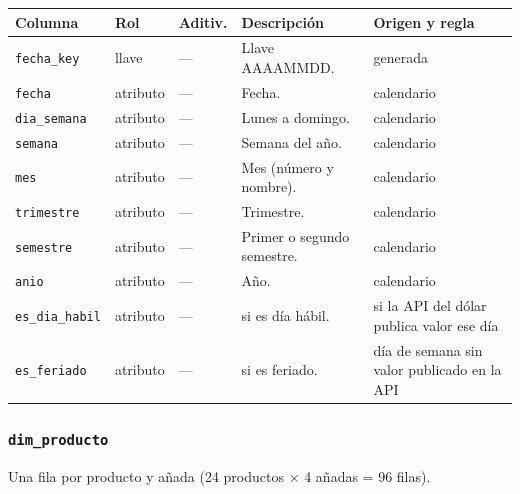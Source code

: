 {\footnotesize
\begin{longtable}{@{}>{\raggedright\arraybackslash}p{}>{\raggedright\arraybackslash}p{}>{\raggedright\arraybackslash}p{}>{\raggedright\arraybackslash}p{}>{\raggedright\arraybackslash}p{}@{}}
\toprule
Columna & Rol & Aditiv. & Descripción & Origen y regla \\
\midrule
\endhead
\texttt{fecha\_key} & llave & — & Llave AAAAMMDD. & generada \\
\texttt{fecha} & atributo & — & Fecha. & calendario \\
\texttt{dia\_semana} & atributo & — & Lunes a domingo. & calendario \\
\texttt{semana} & atributo & — & Semana del año. & calendario \\
\texttt{mes} & atributo & — & Mes (número y nombre). & calendario \\
\texttt{trimestre} & atributo & — & Trimestre. & calendario \\
\texttt{semestre} & atributo & — & Primer o segundo semestre. & calendario \\
\texttt{anio} & atributo & — & Año. & calendario \\
\texttt{es\_dia\_habil} & atributo & — & 1 si es día hábil. & 1 si la API del dólar publica valor ese día \\
\texttt{es\_feriado} & atributo & — & 1 si es feriado. & día de semana sin valor publicado en la API \\
\bottomrule
\end{longtable}
}

\subsubsection*{\texttt{dim\_producto}}
Una fila por producto y añada (24 productos $\times$ 4 añadas = 96 filas).

